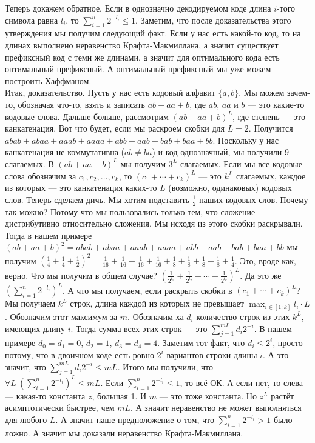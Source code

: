\documentclass{article}
\begin{document}
\begin{itemize}
\begin{Proof}
            Теперь докажем обратное. Если в однозначно декодируемом коде длина $i$-того символа равна $l_i$, то $\sum_{i=1}^n2^{-l_i}\leqslant1$. Заметим, что после доказательства этого утверждения мы получим следующий факт. Если у нас есть какой-то код, то на длинах выполнено неравенство Крафта-Макмиллана, а значит существует префиксный код с теми же длинами, а значит для оптимального кода есть оптимальный префиксный. А оптимальный префиксный мы уже можем построить Хаффманом.\\
            Итак, доказательство. Пусть у нас есть кодовый алфавит $\{a,b\}$. Мы можем зачем-то, обозначая что-то, взять и записать $ab+aa+b$, где $ab$, $aa$ и $b$ --- это какие-то кодовые слова. Дальше больше, рассмотрим $(ab+aa+b)^L$, где степень --- это канкатенация. Вот что будет, если мы раскроем скобки для $L=2$. Получится $abab+abaa+aaab+aaaa+abb+aab+bab+baa+bb$. Поскольку у нас канкатенация не коммутативна ($ab\neq ba$) и код однозначный, мы получили 9 слагаемых. В $(ab+aa+b)^L$ мы получим $3^L$ слагаемых. Если мы все кодовые слова обозначим за $c_1,c_2,\ldots,c_k$, то $(c_1+\cdots+c_k)^L$ --- это $k^L$ слагаемых, каждое из которых --- это канкатенация каких-то $L$ (возможно, одинаковых) кодовых слов. Теперь сделаем дичь. Мы хотим подставить $\frac12$ наших кодовых слов. Почему так можно? Потому что мы пользовались только тем, что сложение дистрибутивно относительно сложения. Мы исходя из этого скобки раскрывали. Тогда в нашем примере $(ab+aa+b)^2=abab+abaa+aaab+aaaa+abb+aab+bab+baa+bb$ мы получим $(\frac14+\frac14+\frac12)^2=\frac1{16}+\frac1{16}+\frac1{16}+\frac1{16}+\frac18+\frac18+\frac18+\frac18+\frac14$. Это, вроде как, верно. Что мы получим в общем случае? $\left(\frac1{2^{l_1}}+\frac1{2^{l_2}}+\cdots+\frac1{2^{l_k}}\right)^L$.  Да это же $\left(\sum_{i=1}^n2^{-l_i}\right)^L$. А что мы получаем, если раскрыть скобки в $(c_1+\cdots+c_k)^L$? Мы получаем $k^L$ строк, длина каждой из которых не превышает $\max_{i\in[1:k]}l_i\cdot L$. Обозначим этот максимум за $m$. Обозначим ха $d_i$ количество строк из этих $k^L$, имеющих длину $i$. Тогда сумма всех этих строк --- это $\sum_{j=1}^{mL}d_i2^{-i}$. В нашем примере $d_0=d_1=0$, $d_2=1$, $d_3=d_4=4$. Заметим тот факт, что $d_i\leqslant2^i$, просто потому, что в двоичном коде есть ровно $2^i$ вариантов строки длины $i$. А это значит, что $\sum_{j=1}^{mL}d_i2^{-i}\leqslant mL$. Итого мы получили, что $\forall L~\left(\sum_{i=1}^n2^{-l_i}\right)^L\leqslant mL$. Если $\sum_{i=1}^n2^{-l_i}\leqslant 1$, то всё ОК. А если нет, то слева --- какая-то константа $z$, большая 1. И $m$ --- это тоже константа. Но $z^L$ растёт асимптотически быстрее, чем $mL$. А значит неравенство не может выполняться для любого $L$. А значит наше предположение о том, что $\sum_{i=1}^n2^{-l_i}>1$ было ложно. А значит мы доказали неравенство Крафта-Макмиллана.

\end{Proof}
\end{itemize}
\end{document}
